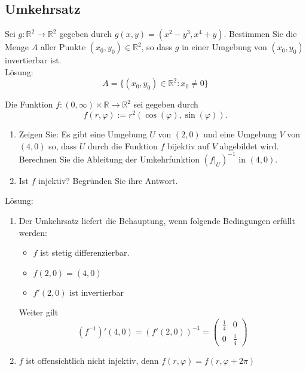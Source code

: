 \subsection{Umkehrsatz}
Sei $g : \mathbb{R}^2 \to \mathbb{R}^2$ gegeben durch $g(x,y) = (x^2 - y^3, x^4 + y)$.
Bestimmen Sie die Menge $A$ aller Punkte $(x_0, y_0) \in \mathbb{R}^2$, so dass $g$ in einer Umgebung von $(x_0, y_0)$ invertierbar ist.\\
Lösung:
\begin{displaymath}
  A = \{(x_0, y_0) \in \mathbb{R}^2 : x_0 \neq 0\}
\end{displaymath}

Die Funktion $f : (0, \infty) \times \mathbb{R} \to \mathbb{R}^2$ sei gegeben durch
\begin{displaymath}
  f(r, \varphi) := r^2 (\cos(\varphi), \sin(\varphi)).
\end{displaymath}
\begin{enumerate}
    \item Zeigen Sie:
    Es gibt eine Umgebung $U$ von $(2,0)$ und eine Umgebung $V$ von $(4,0)$ so, dass $U$ durch die Funktion $f$ bijektiv auf $V$ abgebildet wird.
    Berechnen Sie die Ableitung der Umkehrfunktion $(f|_U)^{-1}$ in $(4,0)$.
    \item Ist $f$ injektiv?
    Begründen Sie ihre Antwort.
\end{enumerate}
Lösung:
\begin{enumerate}
    \item Der Umkehrsatz liefert die Behauptung, wenn folgende Bedingungen erfüllt werden:
    \begin{itemize}
        \item $f$ ist stetig differenzierbar.
        \item $f(2,0) = (4,0)$
        \item $f'(2,0)$ ist invertierbar
    \end{itemize}
    Weiter gilt
    \begin{displaymath}
      (f^{-1})'(4,0) = (f'(2,0))^{-1} = 
      \begin{pmatrix}
        \frac{1}{4} & 0\\
        0 & \frac{1}{4}
      \end{pmatrix}
    \end{displaymath}
    \item $f$ ist offensichtlich nicht injektiv, denn $f(r, \varphi) = f(r, \varphi + 2\pi)$
\end{enumerate}

